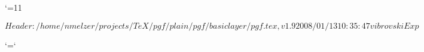 %
%
%


\edef\pgfatcode{\the\catcode`\@}
\catcode`\@=11



\ProvidesPackageRCS $Header: /home/nmelzer/projects/TeX/pgf/plain/pgf/basiclayer/pgf.tex,v 1.9 2008/01/13 10:35:47 vibrovski Exp $











\catcode`\@=\pgfatcode

\endinput
